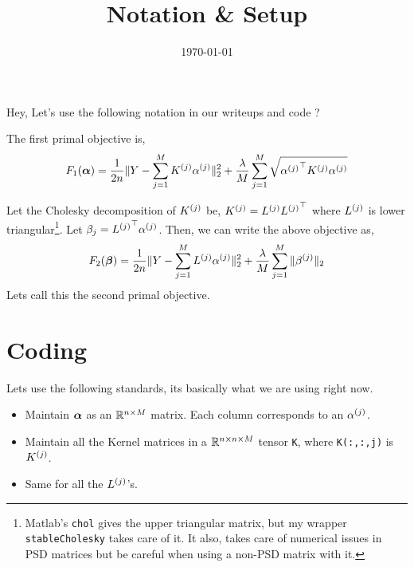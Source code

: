 \documentclass[10pt]{article}
\title{\textbf{Notation \& Setup}}
\author{}
\date{\today}
\begin{document}
\maketitle

Hey, Let's use the following notation in our writeups and code ?

The first primal objective is,
\[
F_1({\bm{\alpha}}) = \frac{1}{2n} \|Y - \sum_{j=1}^M {K^{(j)}} {\alpha^{(j)}} \|_2^2 
  + \frac{\lambda}{M} \sum_{j=1}^M \sqrt{{\alpha^{(j)}}^\top {K^{(j)}} {\alpha^{(j)}}}
\]

Let the Cholesky decomposition of ${K^{(j)}}$ be, ${K^{(j)}} = {L^{(j)}} {L^{(j)}}^\top$ where
${L^{(j)}}$ is lower triangular\footnote{Matlab's \texttt{chol} gives the upper triangular
matrix, but my wrapper \texttt{stableCholesky} takes care of it. It also,
takes care of numerical issues in PSD matrices but be careful when using a
non-PSD matrix with it.}. Let  $\beta_j =  {L^{(j)}}^\top {\alpha^{(j)}}$. Then, we can write
the above objective as,
\[
F_2({\bm{\beta}}) = \frac{1}{2n}\|Y - \sum_{j=1}^M {L^{(j)}} {\alpha^{(j)}}\|_2^2 +
  \frac{\lambda}{M}\sum_{j=1}^M \|{\beta^{(j)}}\|_2
\]
Lets call this the second primal objective.


\section*{Coding}

Lets use the following standards, its basically what we are using right now.
\begin{itemize}
\item Maintain ${\bm{\alpha}}$ as an $\mathbb{R}^{n\times M}$ matrix. Each column corresponds
to an ${\alpha^{(j)}}$.
\item Maintain all the Kernel matrices in a $\mathbb{R}^{n\times n\times M}$ tensor
\texttt{K}, where \texttt{K(:,:,j)} is ${K^{(j)}}$.
\item Same for all the ${L^{(j)}}$'s.
\end{itemize}







\end{document}
